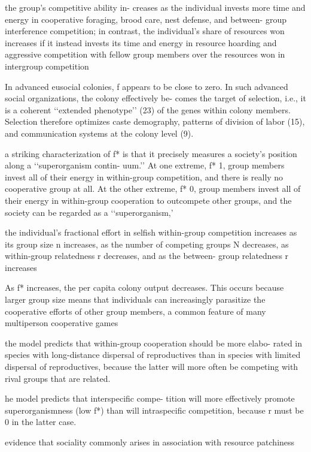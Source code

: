 \documentclass{tufte-book} %
\begin{document}
the group’s competitive ability in- creases as the individual invests more time and energy in cooperative foraging, brood care, nest defense, and between- group interference competition; in contrast, the individual’s share of resources won increases if it instead invests its time and energy in resource hoarding and aggressive competition with fellow group members over the resources won in intergroup competition

In advanced eusocial colonies, f appears to be close to zero. In such advanced social organizations, the colony effectively be- comes the target of selection, i.e., it is a coherent ‘‘extended phenotype’’ (23) of the genes within colony members. Selection therefore optimizes caste demography, patterns of division of labor (15), and communication systems at the colony level (9).

a striking characterization of f* is that it precisely measures a society’s position along a ‘‘superorganism contin- uum.’’ At one extreme, f* 1, group members invest all of their energy in within-group competition, and there is really no cooperative group at all. At the other extreme, f* 0, group members invest all of their energy in within-group cooperation to outcompete other groups, and the society can be regarded as a ‘‘superorganism,’

the individual’s fractional effort in selfish within-group competition increases as its group size n increases, as the number of competing groups N decreases, as within-group relatedness r decreases, and as the between- group relatedness r increases

As f* increases, the per capita colony output decreases. This occurs because larger group size means that individuals can increasingly parasitize the cooperative efforts of other group members, a common feature of many multiperson cooperative games

the model predicts that within-group cooperation should be more elabo- rated in species with long-distance dispersal of reproductives than in species with limited dispersal of reproductives, because the latter will more often be competing with rival groups that are related.

he model predicts that interspecific compe- tition will more effectively promote superorganismness (low f*) than will intraspecific competition, because r must be 0 in the latter case.

evidence that sociality commonly arises in association with resource patchiness
\end{document}
